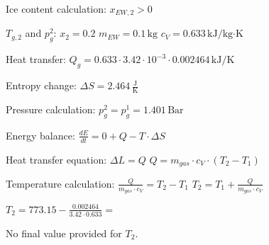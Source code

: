 Ice content calculation:  
\( x_{EW,2} > 0 \)  

\( T_{g,2} \) and \( p_g^2 \):  
\( x_2 = 0.2 \)  
\( m_{EW} = 0.1 \, \text{kg} \)  
\( c_V = 0.633 \, \text{kJ/kg·K} \)  

Heat transfer:  
\( Q_g = 0.633 \cdot 3.42 \cdot 10^{-3} \cdot 0.002464 \, \text{kJ/K} \)  

Entropy change:  
\( \Delta S = 2.464 \, \frac{\text{J}}{\text{K}} \)  

Pressure calculation:  
\( p_g^2 = p_g^1 = 1.401 \, \text{Bar} \)  

Energy balance:  
\( \frac{dE}{dt} = 0 + Q - T \cdot \Delta S \)  

Heat transfer equation:  
\( \Delta L = Q \)  
\( Q = m_{gas} \cdot c_V \cdot (T_2 - T_1) \)  

Temperature calculation:  
\( \frac{Q}{m_{gas} \cdot c_V} = T_2 - T_1 \)  
\( T_2 = T_1 + \frac{Q}{m_{gas} \cdot c_V} \)  

\( T_2 = 773.15 - \frac{0.002464}{3.42 \cdot 0.633} = \)  

No final value provided for \( T_2 \).